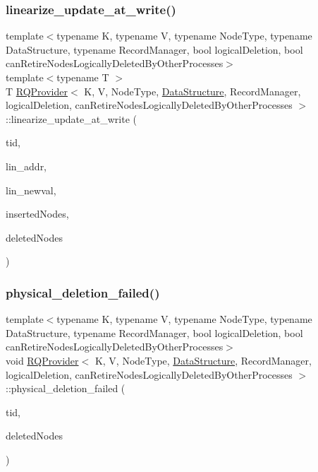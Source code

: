 \subsubsection{\texorpdfstring{linearize\+\_\+update\+\_\+at\+\_\+write()}{linearize\_update\_at\_write()}\hspace{0.1cm}{\footnotesize\ttfamily [5/5]}}
{\footnotesize\ttfamily template$<$typename K, typename V, typename Node\+Type, typename Data\+Structure, typename Record\+Manager, bool logical\+Deletion, bool can\+Retire\+Nodes\+Logically\+Deleted\+By\+Other\+Processes$>$ \\
template$<$typename T $>$ \\
T \hyperlink{classRQProvider}{R\+Q\+Provider}$<$ K, V, Node\+Type, \hyperlink{classDataStructure}{Data\+Structure}, Record\+Manager, logical\+Deletion, can\+Retire\+Nodes\+Logically\+Deleted\+By\+Other\+Processes $>$\+::linearize\+\_\+update\+\_\+at\+\_\+write (\begin{DoxyParamCaption}\item[{const int}]{tid,  }\item[{T volatile $\ast$const}]{lin\+\_\+addr,  }\item[{const T \&}]{lin\+\_\+newval,  }\item[{Node\+Type $\ast$const $\ast$const}]{inserted\+Nodes,  }\item[{Node\+Type $\ast$const $\ast$const}]{deleted\+Nodes }\end{DoxyParamCaption})\hspace{0.3cm}{\ttfamily [inline]}}

\mbox{\label{classRQProvider_a1fb29a074556e0431ed22f2bee394c22}} 
\subsubsection{\texorpdfstring{physical\+\_\+deletion\+\_\+failed()}{physical\_deletion\_failed()}\hspace{0.1cm}{\footnotesize\ttfamily [1/5]}}
{\footnotesize\ttfamily template$<$typename K, typename V, typename Node\+Type, typename Data\+Structure, typename Record\+Manager, bool logical\+Deletion, bool can\+Retire\+Nodes\+Logically\+Deleted\+By\+Other\+Processes$>$ \\
void \hyperlink{classRQProvider}{R\+Q\+Provider}$<$ K, V, Node\+Type, \hyperlink{classDataStructure}{Data\+Structure}, Record\+Manager, logical\+Deletion, can\+Retire\+Nodes\+Logically\+Deleted\+By\+Other\+Processes $>$\+::physical\+\_\+deletion\+\_\+failed (\begin{DoxyParamCaption}\item[{const int}]{tid,  }\item[{Node\+Type $\ast$const $\ast$const}]{deleted\+Nodes }\end{DoxyParamCaption})\hspace{0.3cm}{\ttfamily [inline]}}

